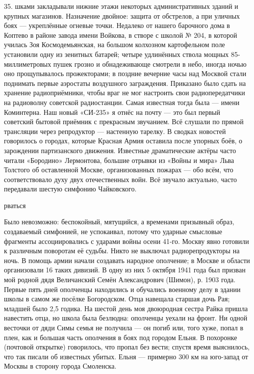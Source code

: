 35. шками закладывали нижние этажи некоторых административных зданий и крупных магазинов. Назначение двойное: защита от обстрелов, а при уличных боях — укреплённые огневые точки. Недалеко от нашего барочного дома в Коптево в районе завода имени Войкова, в створе с школой № 204, в которой училась Зоя Космодемьянская, на большом колхозном картофельном поле установили одну из зенитных батарей; четыре удлинённых ствола мощных 85-миллиметровых пушек грозно и обнадеживающе смотрели в небо, иногда ночью оно прощупывалось прожекторами; в поздние вечерние часы над Москвой стали поднимать первые аэростаты воздушного заграждения. Приказано было сдать на хранение радиоприёмники, чтобы враг не мог настроить свои радиопередатчики на радиоволну советской радиостанции. Самая известная тогда была — имени Коминтерна. Наш новый «СИ-235» я отнёс на почту — это был первый советский бытовой приёмник с прекрасным звучанием. Всё слушали по прямой трансляции через репродуктор — настенную тарелку. В сводках новостей говорилось о городах, которые Красная Армия оставила после упорных боёв, о зарождении партизанского движения. Известные драматические актёры часто читали «Бородино» Лермонтова, большие отрывки из «Войны и мира» Льва Толстого об оставленной Москве, организованных пожарах — обо всём, что соответствовало духу двух отечественных войн. Всё звучало актуально, часто передавали шестую симфонию Чайковского.

рваться

Было невозможно: беспокойный, мятущийся, а временами призывный образ, создаваемый симфонией, не успокаивал, потому что ударные смысловые фрагменты ассоциировались с ударами войны осени 41-го. Москву явно готовили к различным поворотам её судьбы. Никто не выключал радиорепродукторы на ночь. В помощь армии начали создавать народное ополчение; в Москве и области организовали 16 таких дивизий. В одну из них 5 октября 1941 года был призван мой родной дядя Величанский Семён Александрович (Шимон), р. 1903 года. Первые пять дней ополченцы находились и обучались военному делу в здании школы в самом же посёлке Богородском. Отца навещала старшая дочь Рая; младшей было 2,5 годика. На шестой день моя двоюродная сестра Райка пришла навестить отца, но школа была безлюдна: ополченцы уехали на фронт. Ни одной весточки от дяди Симы семья не получила — он погиб или, того хуже, попал в плен, как и большая часть ополчения в боях под городом Ельня. В похоронке (почтовой открытке) говорилось, что пропал без вести; спустя время выяснилось, что так писали об известных убитых. Ельня — примерно 300 км на юго-запад от Москвы в сторону города Смоленска.

